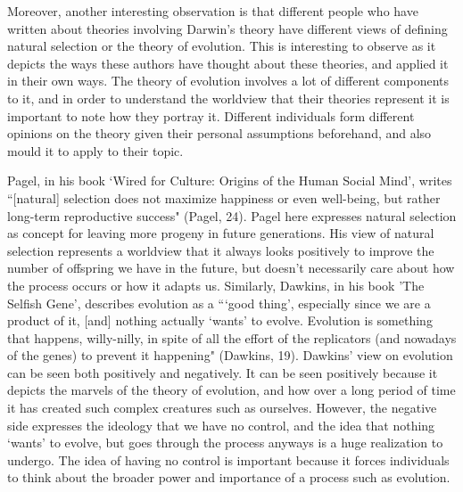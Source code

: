 \documentclass[11pt, oneside]{article}
\begin{document}
\par Moreover, another interesting observation is that different people who have written about theories involving Darwin's theory have different views of defining natural selection or the theory of evolution. This is interesting to observe as it depicts the ways these authors have thought about these theories, and applied it in their own ways. The theory of evolution involves a lot of different components to it, and in order to understand the worldview that their theories represent it is important to note how they portray it. Different individuals form different opinions on the theory given their personal assumptions beforehand, and also mould it to apply to their topic.

\par Pagel, in his book `Wired for Culture: Origins of the Human Social Mind', writes ``[natural] selection does not maximize happiness or even well-being, but rather long-term reproductive success" (Pagel, 24). Pagel here expresses natural selection as concept for leaving more progeny in future generations. His view of natural selection represents a worldview that it always looks positively to improve the number of offspring we have in the future, but doesn't necessarily care about how the process occurs or how it adapts us. Similarly, Dawkins, in his book 'The Selfish Gene', describes evolution as a ```good thing', especially since we are a product of it, [and] nothing actually `wants' to evolve. Evolution is something that happens, willy-nilly, in spite of all the effort of the replicators (and nowadays of the genes) to prevent it happening" (Dawkins, 19). Dawkins' view on evolution can be seen both positively and negatively. It can be seen positively because it depicts the marvels of the theory of evolution, and how over a long period of time it has created such complex creatures such as ourselves. However, the negative side expresses the ideology that we have no control, and the idea that nothing `wants' to evolve, but goes through the process anyways is a huge realization to undergo. The idea of having no control is important because it forces individuals to think about the broader power and importance of a process such as evolution. 


\end{document}
